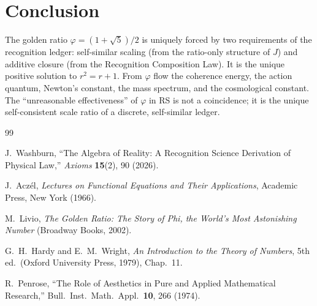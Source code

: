\documentclass[12pt,a4paper]{article}
\theoremstyle{definition}
\theoremstyle{remark}
\begin{document}
\section{Conclusion}
\label{sec:conclusion}

The golden ratio $\varphi = (1+\sqrt{5})/2$ is uniquely forced
by two requirements of the recognition ledger: self-similar
scaling (from the ratio-only structure of $J$) and additive
closure (from the Recognition Composition Law).  It is the
unique positive solution to $r^2 = r + 1$.  From $\varphi$ flow
the coherence energy, the action quantum, Newton's constant,
the mass spectrum, and the cosmological constant.  The
``unreasonable effectiveness'' of $\varphi$ in RS is not a
coincidence; it is the unique self-consistent scale ratio of a
discrete, self-similar ledger.

\begin{thebibliography}{99}

J.~Washburn, ``The Algebra of Reality: A Recognition Science Derivation
of Physical Law,'' \emph{Axioms} \textbf{15}(2), 90 (2026).

J.~Acz\'el, \textit{Lectures on Functional Equations and Their Applications},
Academic Press, New York (1966).

M.~Livio, \textit{The Golden Ratio: The Story of Phi, the
World's Most Astonishing Number} (Broadway Books, 2002).

G.~H.~Hardy and E.~M.~Wright, \textit{An Introduction to the
Theory of Numbers}, 5th ed.\ (Oxford University Press, 1979),
Chap.~11.

R.~Penrose, ``The Role of Aesthetics in Pure and Applied
Mathematical Research,'' Bull.\ Inst.\ Math.\ Appl.\
\textbf{10}, 266 (1974).

\end{thebibliography}
\end{document}
